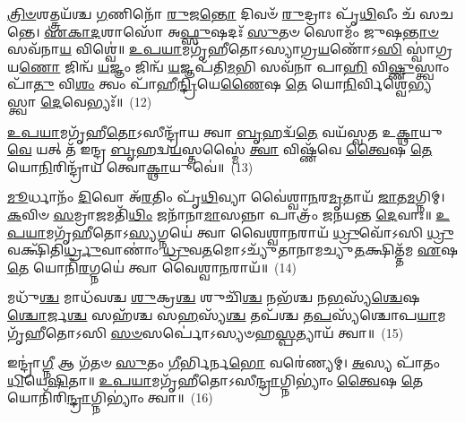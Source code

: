 {\anuvakamend[{𑌯𑍇 𑌦𑍇᳴\-\ul{𑌵𑌾}\-𑌸𑍍𑌤𑍍𑌰𑌿𑌚᳴𑌤𑍍𑌵𑌾𑌰𑌿𑍞𑌶𑌤𑍍}]}%

\-\ul{𑌤𑍍𑌰𑌿}\-\-\ul{𑍞}\-𑌶𑌤𑍍𑌤𑍍𑌰𑌯᳴𑌶𑍍𑌚 \ul{𑌗}\-𑌣𑌿𑌨𑍋᳴ \ul{𑌰𑍁}\-𑌜\-\ul{𑌨𑍍𑌤𑍋} 𑌦𑌿𑌵𑍞᳴ \ul{𑌰𑍁}\-𑌦𑍍𑌰𑌾𑌃 𑌪𑍃᳴\-\ul{𑌥𑌿}\-𑌵𑍀𑌂 𑌚᳴ 𑌸𑌚𑌨𑍍𑌤𑍇। \ul{𑌏}\-\-\ul{𑌕𑌾}\-\-\ul{𑌦}\-𑌶𑌾𑌸𑍋᳴ 𑌅\-\ul{𑌫𑍍𑌸𑍁}\-𑌷𑌦𑌃᳴ \ul{𑌸𑍁}\-𑌤𑍞 𑌸𑍋𑌮𑌂᳴ 𑌜𑍁𑌷\-\ul{𑌨𑍍𑌤𑌾}\-\-\ul{𑍞} 𑌸𑌵᳴𑌨𑌾\-\ul{𑌯} 𑌵𑌿𑌶𑍍𑌵𑍇॑॥ \ul{𑌉}\-\-\ul{𑌪}\-\-\ul{𑌯𑌾}\-𑌮𑌗𑍃᳴𑌹𑍀𑌤𑍋\-𑌽𑌸𑍍𑌯𑌾𑌗𑍍𑌰\-\ul{𑌯}\-𑌣𑍋᳴\-𑌽\-\ul{𑌸𑌿} 𑌸𑍍𑌵𑌾॑𑌗𑍍𑌰𑌯\-\ul{𑌣𑍋} 𑌜𑌿𑌨𑍍𑌵᳴ \ul{𑌯}\-𑌜𑍍𑌞𑌂 𑌜𑌿𑌨𑍍𑌵᳴ \ul{𑌯}\-𑌜𑍍𑌞𑌪᳴𑌤𑌿\-\ul{𑌮}\-𑌭𑌿 𑌸𑌵᳴𑌨𑌾 𑌪𑌾\-\ul{𑌹𑌿} 𑌵𑌿\-\ul{𑌷𑍍𑌣𑍁}\-𑌸𑍍𑌤𑍍𑌵𑌾𑌂 𑌪𑌾᳴\-\ul{𑌤𑍁} 𑌵𑌿\-\ul{𑌶𑌂} 𑌤𑍍𑌵𑌂 𑌪𑌾᳴𑌹𑍀\-\ul{𑌨𑍍𑌦𑍍𑌰𑌿}\-𑌯𑍇\-\ul{𑌣𑍈}\-𑌷 \ul{𑌤𑍇} 𑌯𑍋\-\ul{𑌨𑌿}\-𑌰𑍍𑌵𑌿𑌶𑍍𑌵𑍇॑𑌭𑍍𑌯𑌸𑍍𑌤𑍍𑌵𑌾 \ul{𑌦𑍇}\-𑌵𑍇𑌭𑍍𑌯𑌃᳴॥~(12)

{\anuvakamend[{\-\ul{𑌤𑍍𑌰𑌿}\-\-\ul{𑍞}\-𑌶𑌦𑍍 𑌦𑍍𑌵𑌿𑌚᳴𑌤𑍍𑌵𑌾𑌰𑌿𑍞𑌶𑌤𑍍}]}%

\-\ul{𑌉}\-\-\ul{𑌪}\-\-\ul{𑌯𑌾}\-𑌮𑌗𑍃᳴𑌹𑍀\-\ul{𑌤𑍋}\-\-𑌽𑌸𑍀𑌨𑍍𑌦𑍍𑌰𑌾᳴𑌯 𑌤𑍍𑌵𑌾 \ul{𑌬𑍃}\-𑌹𑌦𑍍𑌵᳴\-\ul{𑌤𑍇} 𑌵𑌯᳴𑌸𑍍𑌵𑌤 𑌉\-\ul{𑌕𑍍𑌥𑌾}\-𑌯𑍁\-\ul{𑌵𑍇} 𑌯𑌤𑍍 𑌤᳴ 𑌇𑌨𑍍𑌦𑍍𑌰 \ul{𑌬𑍃}\-𑌹𑌦𑍍𑌵\-\ul{𑌯}\-𑌸𑍍𑌤𑌸𑍍𑌮𑍈॑ \ul{𑌤𑍍𑌵𑌾} 𑌵𑌿𑌷𑍍𑌣᳴𑌵𑍇 \ul{𑌤𑍍𑌵𑍈}\-𑌷 \ul{𑌤𑍇} 𑌯𑍋\-\ul{𑌨𑌿}\-𑌰𑌿𑌨𑍍𑌦𑍍𑌰𑌾᳴𑌯 𑌤𑍍𑌵𑍋\-\ul{𑌕𑍍𑌥𑌾}\-𑌯𑍁𑌵𑍇॑॥~(13)

{\anuvakamend[{\-\ul{𑌉}\-\-\ul{𑌪}\-\-\ul{𑌯𑌾}\-𑌮𑌗𑍃᳴𑌹𑍀\-\ul{𑌤𑍋} 𑌦𑍍𑌵𑌾𑌵𑌿𑍞᳴𑌶𑌤𑌿𑌃}]}%

\-\ul{𑌮𑍂}\-𑌰𑍍𑌧𑌾𑌨𑌂᳴ \ul{𑌦𑌿}\-𑌵𑍋 𑌅᳴\-\ul{𑌰}\-𑌤𑌿𑌂 𑌪𑍃᳴\-\ul{𑌥𑌿}\-𑌵𑍍𑌯𑌾 𑌵𑍈॑𑌶𑍍𑌵𑌾\-\ul{𑌨}\-𑌰\-\ul{𑌮𑍃}\-𑌤𑌾𑌯᳴ \ul{𑌜𑌾}\-𑌤\-\ul{𑌮}\-𑌗𑍍𑌨𑌿𑌮𑍍। \ul{𑌕}\-𑌵𑌿𑍞 \ul{𑌸}\-𑌮𑍍𑌰𑌾\-\ul{𑌜}\-𑌮𑌤𑌿᳴\-\ul{𑌥𑌿𑌂} 𑌜𑌨𑌾᳴𑌨𑌾\-\ul{𑌮𑌾}\-𑌸𑌨𑍍𑌨𑌾 𑌪𑌾𑌤𑍍𑌰𑌂᳴ 𑌜𑌨𑌯𑌨𑍍𑌤 \ul{𑌦𑍇}\-𑌵𑌾𑌃॥ \ul{𑌉}\-\-\ul{𑌪}\-\-\ul{𑌯𑌾}\-𑌮𑌗𑍃᳴𑌹𑍀𑌤𑍋\-𑌽\-\ul{𑌸𑍍𑌯}\-𑌗𑍍𑌨𑌯𑍇॑ 𑌤𑍍𑌵𑌾 𑌵𑍈𑌶𑍍𑌵𑌾\-\ul{𑌨}\-𑌰𑌾𑌯᳴ \ul{𑌧𑍍𑌰𑍁}\-𑌵𑍋᳴\-𑌽𑌸𑌿 \ul{𑌧𑍍𑌰𑍁}\-𑌵𑌕𑍍𑌷𑌿᳴𑌤𑌿\-\ul{𑌰𑍍𑌧𑍍𑌰𑍁}\-𑌵𑌾𑌣𑌾𑌂॑ \ul{𑌧𑍍𑌰𑍁}\-𑌵\-\ul{𑌤}\-𑌮𑍋\-𑌽𑌚𑍍𑌯𑍁᳴𑌤𑌾𑌨𑌾𑌮𑌚𑍍𑌯𑍁\-\ul{𑌤}\-𑌕𑍍𑌷𑌿𑌤𑍍𑌤᳴𑌮 \ul{𑌏}\-𑌷 \ul{𑌤𑍇} 𑌯𑍋𑌨𑌿᳴\-\ul{𑌰}\-𑌗𑍍𑌨𑌯𑍇॑ 𑌤𑍍𑌵𑌾 𑌵𑍈𑌶𑍍𑌵𑌾\-\ul{𑌨}\-𑌰𑌾𑌯᳴॥~(14)

{\anuvakamend[{\-\ul{𑌮𑍂}\-𑌰𑍍𑌧𑌾\-\ul{𑌨𑌂} 𑌪𑌞𑍍𑌚᳴𑌤𑍍𑌰𑌿𑍞𑌶𑌤𑍍}]}%

𑌮𑌧𑍁᳴\-\ul{𑌶𑍍𑌚} 𑌮𑌾𑌧᳴𑌵𑌶𑍍𑌚 \ul{𑌶𑍁}\-𑌕𑍍𑌰\-\ul{𑌶𑍍𑌚} 𑌶𑍁𑌚𑌿᳴\-\ul{𑌶𑍍𑌚} 𑌨𑌭᳴𑌶𑍍𑌚 𑌨\-\ul{𑌭}\-𑌸𑍍𑌯᳴\-\ul{𑌶𑍍𑌚𑍇}\-𑌷\-\ul{𑌶𑍍𑌚𑍋}\-𑌰𑍍𑌜\-\ul{𑌶𑍍𑌚} 𑌸𑌹᳴𑌶𑍍𑌚 𑌸\-\ul{𑌹}\-𑌸𑍍𑌯᳴\-\ul{𑌶𑍍𑌚} 𑌤𑌪᳴𑌶𑍍𑌚 𑌤\-\ul{𑌪}\-𑌸𑍍𑌯᳴𑌶𑍍𑌚𑍋𑌪\-\ul{𑌯𑌾}\-𑌮𑌗𑍃᳴𑌹𑍀𑌤𑍋\-𑌽𑌸𑌿 \ul{𑌸}\-\-\ul{𑍞}\-𑌸𑌰𑍍𑌪𑍋॑\-𑌽𑌸𑍍𑌯𑍞𑌹\-\ul{𑌸𑍍𑌪}\-𑌤𑍍𑌯𑌾𑌯᳴ 𑌤𑍍𑌵𑌾॥~(15)

{\anuvakamend[{𑌮𑌧𑍁᳴\-\ul{𑌸𑍍𑌤𑍍𑌰𑌿}\-\-\ul{𑍞}\-𑌶𑌤𑍍}]}%

𑌇𑌨𑍍𑌦𑍍𑌰𑌾॑\-\ul{𑌗𑍍𑌨𑍀} 𑌆 𑌗᳴𑌤𑍞 \ul{𑌸𑍁}\-𑌤𑌂 \ul{𑌗𑍀}\-𑌰𑍍𑌭𑌿𑌰𑍍𑌨\-\ul{𑌭𑍋} 𑌵𑌰𑍇॑𑌣𑍍𑌯𑌮𑍍। \ul{𑌅}\-𑌸𑍍𑌯 𑌪𑌾᳴𑌤𑌂 \ul{𑌧𑌿}\-𑌯𑍇\-\ul{𑌷𑌿}\-𑌤𑌾॥ \ul{𑌉}\-\-\ul{𑌪}\-\-\ul{𑌯𑌾}\-𑌮𑌗𑍃᳴𑌹𑍀𑌤𑍋\-𑌽𑌸𑍀\-\ul{𑌨𑍍𑌦𑍍𑌰𑌾}\-𑌗𑍍𑌨𑌿\-𑌭𑍍𑌯𑌾𑌂॑ \ul{𑌤𑍍𑌵𑍈}\-𑌷 \ul{𑌤𑍇} 𑌯𑍋𑌨𑌿᳴𑌰𑌿\-\ul{𑌨𑍍𑌦𑍍𑌰𑌾}\-𑌗𑍍𑌨𑌿\-𑌭𑍍𑌯𑌾𑌂॑ 𑌤𑍍𑌵𑌾॥~(16)

